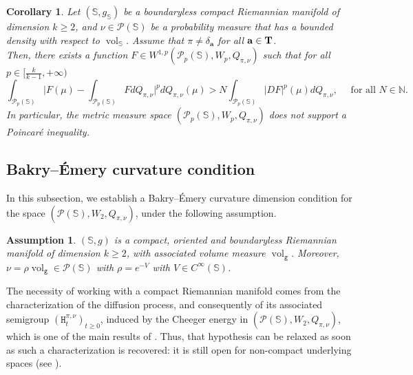 \documentclass[10pt,leqno]{amsart}
\numberwithin{equation}{section}
\newtheorem{co}[teorema]{Corollary}
\newtheorem{ass}[teorema]{Assumption}
\newcommand{\N}{\mathbb{N}}
\newcommand{\PP}{\mathcal{P}}
\newcommand{\Ss}{\mathbb{S}}
\begin{document}
\begin{co}\label{co: manifold non poincare}
    Let $(\mathbb{S},g_{\mathbb{S}})$ be a boundaryless compact Riemannian manifold of dimension $k\geq 2$, and $\nu\in \PP(\mathbb{S})$ be a probability measure that has a bounded density with respect to $\operatorname{vol}_{\mathbb{S}}$. Assume that $\pi \neq \delta_{\mathbf{a}}$ for all $\mathbf{a}\in \bold{T}$.
    \\
    Then, there exists a function $F \in W^{1,p}(\PP_p(\Ss),W_p,Q_{\pi,\nu})$ such that for all $p \in [\frac{k}{k-1},+\infty)$
    \begin{equation}\label{eq: non poincare manifold}
        \int_{\PP_p(\Ss)} \bigg| F(\mu) - \int_{\PP_p(\Ss)} F dQ_{\pi,\nu} \bigg|^p dQ_{\pi,\nu}(\mu) > N \int_{\PP_p(\Ss)} |DF|^p(\mu) dQ_{\pi,\nu}, \quad \text{ for all }N\in \N.
    \end{equation}
    In particular, the metric measure space $(\PP_p(\Ss),W_p,Q_{\pi,\nu})$ does not support a Poincaré inequality.
\end{co}












\subsection{Bakry--\'Emery curvature condition}\label{subsec: BE}
In this subsection, we establish a Bakry--\'Emery curvature dimension condition for the space $(\PP(\Ss),W_2,Q_{\pi,\nu})$, under the following assumption.

\begin{ass}\label{assumption: manifold}
    $(\Ss,g)$ is a compact, oriented and boundaryless Riemannian manifold of dimension $k\geq 2$, with associated volume measure $\operatorname{vol}_{\mathtt{g}}$. Moreover, $\nu = \rho \operatorname{vol}_{\mathtt{g}} \in \PP(\Ss)$ with $\rho = e^{-V}$ with $V\in C^\infty(\Ss)$.
\end{ass}

The necessity of working with a compact Riemannian manifold comes from the characterization of the diffusion process, and consequently of its associated semigroup $(\mathtt{H}^{\pi,\nu}_t)_{t\geq 0}$, induced by the Cheeger energy in $(\PP(\Ss),W_2,Q_{\pi,\nu})$, which is one of the main results of \cite[Theorem 3.24]{delloschiavo2024massive}. Thus, that hypothesis can be relaxed as soon as such a characterization is recovered: it is still open for non-compact underlying spaces (see \cite[Example 3.40]{delloschiavo2024massive}). 
\end{document}
